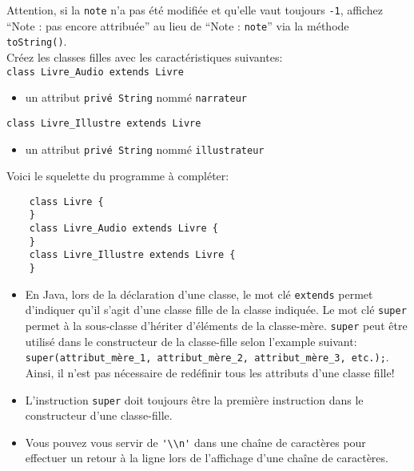 \begin{Exercice}[20 minutes]
Attention, si la \lstinline{note} n'a pas été modifiée et qu'elle vaut toujours \lstinline{-1}, affichez ``Note : pas encore attribuée'' au lieu de ``Note : \lstinline{note}'' via la méthode \lstinline{toString()}. \\
Créez les classes filles avec les caractéristiques suivantes:\\
\lstinline{class Livre_Audio extends Livre}
\begin{itemize}
	\item un attribut \lstinline{privé String} nommé \lstinline{narrateur}
\end{itemize}
\lstinline{class Livre_Illustre extends Livre}
\begin{itemize}
	\item un attribut \lstinline{privé String} nommé \lstinline{illustrateur}
\end{itemize}
Voici le squelette du programme à compléter:
\begin{lstlisting}
	class Livre {
	}
	class Livre_Audio extends Livre {
	}
	class Livre_Illustre extends Livre {
	}\end{lstlisting}
\begin{conseil}
    \begin{itemize}
        \item En Java, lors de la déclaration d'une classe, le mot clé \lstinline{extends} permet d'indiquer qu'il s'agit d'une classe fille de la classe indiquée. 
        Le mot clé \lstinline{super} permet à la sous-classe d'hériter d'éléments de la classe-mère. \lstinline{super} peut être utilisé dans le constructeur de la classe-fille selon l'example suivant: \lstinline{super(attribut_mère_1, attribut_mère_2, attribut_mère_3, etc.);}. Ainsi, il n'est pas nécessaire de redéfinir tous les attributs d'une classe fille!
        \item L'instruction \lstinline{super} doit toujours être la première instruction dans le constructeur d'une classe-fille.
        \item Vous pouvez vous servir de \lstinline{'\\n'} dans une chaîne de caractères pour effectuer un retour à la ligne lors de l'affichage d'une chaîne de caractères.
    \end{itemize}
\end{conseil}
\begin{solution}
	
\end{solution}
\end{Exercice}
